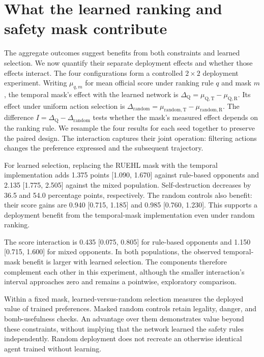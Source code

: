 \section{What the learned ranking and safety mask contribute}
\label{sec:jesper-components}
The aggregate outcomes suggest benefits from both constraints and learned
selection. We now quantify their separate deployment effects and whether
those effects interact. The four configurations form a controlled $2\times2$ deployment experiment.
Writing $\mu_{q,m}$ for mean official score under ranking rule $q$ and
mask $m$, the temporal mask's effect with the learned network is
$\Delta_{\mathrm{Q}}=\mu_{\mathrm{Q,T}}-\mu_{\mathrm{Q,R}}$.
Its effect under uniform action selection is
$\Delta_{\mathrm{random}}=\mu_{\mathrm{random,T}}-\mu_{\mathrm{random,R}}$.
The difference $I=\Delta_{\mathrm{Q}}-\Delta_{\mathrm{random}}$ tests whether
the mask's measured effect depends on the ranking rule. We resample the
four results for each seed together to preserve the paired design.
The interaction captures their joint operation: filtering actions changes
the preference expressed and the subsequent trajectory.

For learned selection, replacing the RUEHL mask with the temporal implementation adds
1.375 points [1.090, 1.670] against rule-based opponents and 2.135
[1.775, 2.505] against the mixed population. Self-destruction decreases
by 36.5 and 54.0 percentage points, respectively. The random controls
also benefit: their score gains are 0.940 [0.715, 1.185] and 0.985
[0.760, 1.230]. This supports a deployment benefit from the temporal-mask implementation
even under random ranking.

The score interaction is 0.435 [0.075, 0.805] for rule-based opponents
and 1.150 [0.715, 1.600] for mixed opponents. In both populations, the
observed temporal-mask benefit is larger with learned selection. The
components therefore complement each other in this experiment, although
the smaller interaction's interval approaches zero and remains a
pointwise, exploratory comparison.

Within a fixed mask, learned-versus-random selection measures the deployed
value of trained preferences. Masked random controls retain legality,
danger, and bomb-usefulness checks. An advantage over them demonstrates
value beyond these constraints, without implying that the network learned
the safety rules independently. Random deployment does not recreate an
otherwise identical agent trained without learning.

